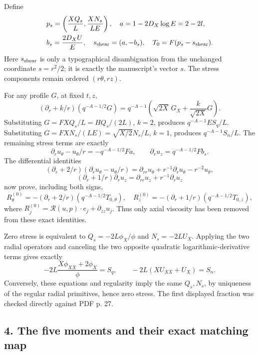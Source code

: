 \documentclass[10pt,a4paper]{article}
\begin{document}
Define
\[
\begin{aligned}
&p_s=\left(\frac{XQ_s}L,\frac{XN_s}{LE}\right),\quad a=1-2D_X\log E=2-2l,\\
&b_s=\frac{2D_XU}{E},\quad s_{\rm shear}=(a,-b_s),\quad T_0=F(p_s-s_{\rm shear}).
\end{aligned}
\]
Here \(s_{\rm shear}\) is only a typographical disambiguation from the unchanged coordinate \(s=r^2/2\); it is exactly the manuscript's vector \(s\). The stress components remain ordered \((r\theta,rz)\).

For any profile \(G\), at fixed \(t,z\),
\[
(\partial_r+k/r)(q^{-A-1/2}G)
=q^{-A-1}\left(\sqrt{2X}\,G_X+\frac k{\sqrt{2X}}G\right).
\]
Substituting \(G=FXQ_s/L=HQ_s/(2L)\), \(k=2\), produces \(q^{-A-1}ES_q/L\). Substituting \(G=FXN_s/(LE)=\sqrt{X/2}N_s/L\), \(k=1\), produces \(q^{-A-1}S_n/L\). The remaining stress terms are exactly
\[
\partial_ru_\theta-u_\theta/r=-q^{-A-1/2}Fa,
\qquad \partial_ru_z=q^{-A-1/2}Fb_s.
\]
The differential identities
\[
(\partial_r+2/r)(\partial_ru_\theta-u_\theta/r)
=\partial_{rr}u_\theta+r^{-1}\partial_ru_\theta-r^{-2}u_\theta,
\]
\[
(\partial_r+1/r)\partial_ru_z=\partial_{rr}u_z+r^{-1}\partial_ru_z
\]
now prove, including both signs,
\[
R^{(0)}_\theta=-(\partial_r+2/r)(q^{-A-1/2}T_{0,\theta}),
\quad R^{(0)}_z=-(\partial_r+1/r)(q^{-A-1/2}T_{0,z}),
\]
where \(R^{(0)}_j=\mathcal R(u,p)\cdot e_j+\partial_{zz}u_j\). Thus only axial viscosity has been removed from these exact identities.

Zero stress is equivalent to
\(Q_s=-2L\phi_X/\phi\) and \(N_s=-2LU_X\). Applying the two radial operators and canceling the two opposite quadratic logarithmic-derivative terms gives exactly
\[
-2L\frac{X\phi_{XX}+2\phi_X}{\phi}=S_q,
\qquad -2L(XU_{XX}+U_X)=S_n.
\]
Conversely, these equations and regularity imply the same \(Q_s,N_s\), by uniqueness of the regular radial primitives, hence zero stress. The first displayed fraction was checked directly against PDF p. 27.

\subsection{4. The five moments and their exact matching map}
\end{document}
